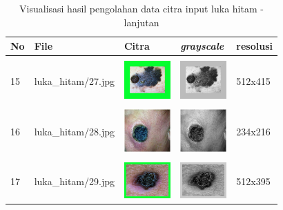 \begin{table}[H]
	\centering
	\caption{Visualisasi hasil pengolahan data citra input luka hitam - lanjutan}
	\label{tabel_input_3}
	\begin{tabular}{|m{0.2in}|m{1.2in}|m{0.7in}|m{0.7in}|m{0.7in}|}
		\hline
		\textbf{No} & \textbf{File} & \textbf{Citra} & \textbf{\emph{grayscale}} & \textbf{resolusi} \\
		\hline
		
		& &  &  &\\
		15 & 
		luka\_hitam/27.jpg &
		\includegraphics[width=0.7in]{dataset/dataset_3/luka_hitam/ready/27.jpg}&
		\includegraphics[width=0.7in]{dataset/dataset_3/luka_hitam/ready/27_gray.jpg}&
		512x415\\
		\hline
		
		& &  &  &\\
		16 & 
		luka\_hitam/28.jpg &
		\includegraphics[width=0.7in]{dataset/dataset_3/luka_hitam/ready/28.jpg}&
		\includegraphics[width=0.7in]{dataset/dataset_3/luka_hitam/ready/28_gray.jpg}&
		234x216\\
		\hline
		
		& &  &  &\\
		17 & 
		luka\_hitam/29.jpg &
		\includegraphics[width=0.7in]{dataset/dataset_3/luka_hitam/ready/29.jpg}&
		\includegraphics[width=0.7in]{dataset/dataset_3/luka_hitam/ready/29_gray.jpg}&
		512x395\\
		\hline
		

\end{tabular}
\end{table}
